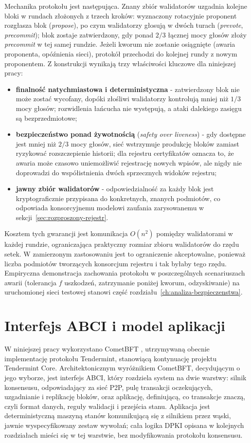 Mechanika protokołu jest następująca. Znany zbiór walidatorów uzgadnia kolejne bloki w rundach złożonych z trzech kroków: wyznaczony rotacyjnie proponent rozgłasza blok (\emph{propose}), po czym walidatorzy głosują w dwóch turach (\emph{prevote}, \emph{precommit}); blok zostaje zatwierdzony, gdy ponad $2/3$ łącznej mocy głosów złoży \emph{precommit} w tej samej rundzie. Jeżeli kworum nie zostanie osiągnięte (awaria proponenta, opóźnienia sieci), protokół przechodzi do kolejnej rundy z nowym proponentem. Z konstrukcji wynikają trzy właściwości kluczowe dla niniejszej pracy:
\begin{itemize}
    \item \textbf{finalność natychmiastowa i deterministyczna} - zatwierdzony blok nie może zostać wycofany, dopóki złośliwi walidatorzy kontrolują mniej niż $1/3$ mocy głosów; rozwidlenia łańcucha nie występują, a ataki dalekiego zasięgu są bezprzedmiotowe;
    \item \textbf{bezpieczeństwo ponad żywotnością} (\emph{safety over liveness}) - gdy dostępne jest mniej niż $2/3$ mocy głosów, sieć wstrzymuje produkcję bloków zamiast ryzykować rozszczepienie historii; dla rejestru certyfikatów oznacza to, że awaria może czasowo uniemożliwić rejestrację nowych wpisów, ale nigdy nie doprowadzi do współistnienia dwóch sprzecznych widoków rejestru;
    \item \textbf{jawny zbiór walidatorów} - odpowiedzialność za każdy blok jest kryptograficznie przypisana do konkretnych, znanych podmiotów, co odpowiada konsorcyjnemu modelowi zaufania zarysowanemu w sekcji~\ref{sec:rozproszony-rejestr}.
\end{itemize}

Kosztem tych gwarancji jest komunikacja $O(n^2)$ pomiędzy walidatorami w każdej rundzie, ograniczająca praktyczny rozmiar zbioru walidatorów do rzędu setek. W zamierzonym zastosowaniu jest to ograniczenie akceptowalne, ponieważ liczba podmiotów tworzących konsorcjum rejestru i tak byłaby tego rzędu. Empiryczna demonstracja zachowania protokołu w poszczególnych scenariuszach awarii (tolerancja $f$ uszkodzeń, zatrzymanie poniżej kworum, odzyskiwanie) na uruchomionej sieci testowej stanowi część rozdziału~\ref{ch:analiza-bezpieczenstwa}.

\section{Interfejs ABCI i model aplikacji}
\label{sec:abci}

W niniejszej pracy wykorzystano CometBFT \cite{cometbft-docs}, utrzymywaną obecnie implementację protokołu Tendermint, stanowiącą kontynuację projektu Tendermint Core. Architektonicznym wyróżnikiem CometBFT, decydującym o jego wyborze, jest interfejs ABCI, który rozdziela system na dwie warstwy: silnik konsensusu, odpowiadający za sieć P2P, pulę transakcji oczekujących, uzgadnianie i replikację bloków, oraz aplikację, definiującą, co transakcje znaczą, czyli format danych, reguły walidacji i przejścia stanu. Aplikacja jest deterministyczną maszyną stanów komunikującą się z silnikiem przez wąski, jawnie wyspecyfikowany zestaw wywołań; cała logika DPKI opisana w kolejnych rozdziałach mieści się w tej warstwie, bez modyfikowania protokołu konsensusu.

